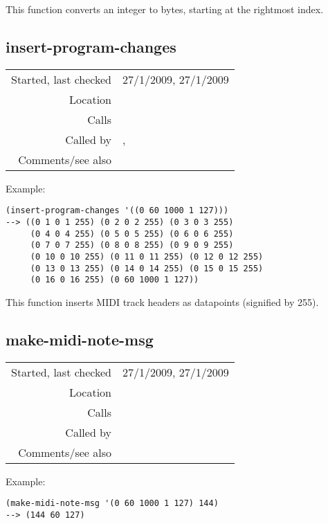 \noindent This function converts an integer to bytes,
starting at the rightmost index.


\subsection*{insert-program-changes}\label{fun:insert-program-changes}

\vspace{0.3cm}
\begin{tabular}{r|p{8cm}}
Started, last checked & 27/1/2009, 27/1/2009 \\
Location & \nameref{sec:MIDI-export} \\
Calls & \\
Called by & \nameref{fun:save-as-midi}, \nameref{fun:saveit} \\
Comments/see also &
\end{tabular}

\vspace{0.5cm}
\noindent Example:
\begin{verbatim}
(insert-program-changes '((0 60 1000 1 127)))
--> ((0 1 0 1 255) (0 2 0 2 255) (0 3 0 3 255)
     (0 4 0 4 255) (0 5 0 5 255) (0 6 0 6 255)
     (0 7 0 7 255) (0 8 0 8 255) (0 9 0 9 255)
     (0 10 0 10 255) (0 11 0 11 255) (0 12 0 12 255)
     (0 13 0 13 255) (0 14 0 14 255) (0 15 0 15 255)
     (0 16 0 16 255) (0 60 1000 1 127))
\end{verbatim}

\noindent This function inserts MIDI track headers as
datapoints (signified by 255).


\subsection*{make-midi-note-msg}\label{fun:make-midi-note-msg}

\vspace{0.3cm}
\begin{tabular}{r|p{8cm}}
Started, last checked & 27/1/2009, 27/1/2009 \\
Location & \nameref{sec:MIDI-export} \\
Calls & \\
Called by & \nameref{fun:create-midi-events} \\
Comments/see also &
\end{tabular}

\vspace{0.5cm}
\noindent Example:
\begin{verbatim}
(make-midi-note-msg '(0 60 1000 1 127) 144)
--> (144 60 127)
\end{verbatim}

